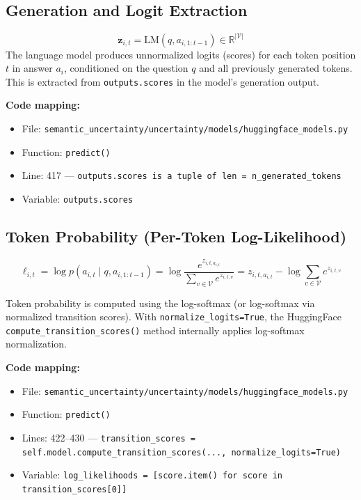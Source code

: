 \documentclass{article}
\begin{document}
\subsection{Generation and Logit Extraction}

\begin{equation}
\boldsymbol{z}_{i,t} = \text{LM}(q, a_{i,1:t-1}) \in \mathbb{R}^{|{\mathcal{V}}|}
\label{eq:logits}
\end{equation}
The language model produces unnormalized logits (scores) for each token position $t$ in answer $a_i$, conditioned on the question $q$ and all previously generated tokens. This is extracted from \texttt{outputs.scores} in the model's generation output.

\textbf{Code mapping:}
\begin{itemize}
    \item File: \texttt{semantic\_uncertainty/uncertainty/models/huggingface\_models.py}
    \item Function: \texttt{predict()}
    \item Line: 417 --- \texttt{outputs.scores is a tuple of len = n\_generated\_tokens}
    \item Variable: \texttt{outputs.scores}
\end{itemize}

\subsection{Token Probability (Per-Token Log-Likelihood)}

\begin{equation}
\ell_{i,t} = \log p(a_{i,t} \mid q, a_{i,1:t-1}) = \log \frac{e^{z_{i,t,a_{i,t}}}}{\sum_{v \in \mathcal{V}} e^{z_{i,t,v}}} = z_{i,t,a_{i,t}} - \log \sum_{v \in \mathcal{V}} e^{z_{i,t,v}}
\label{eq:token_logprob}
\end{equation}

Token probability is computed using the log-softmax (or log-softmax via normalized transition scores). With \texttt{normalize\_logits=True}, the HuggingFace \texttt{compute\_transition\_scores()} method internally applies log-softmax normalization.

\textbf{Code mapping:}
\begin{itemize}
    \item File: \texttt{semantic\_uncertainty/uncertainty/models/huggingface\_models.py}
    \item Function: \texttt{predict()}
    \item Lines: 422--430 --- \texttt{transition\_scores = self.model.compute\_transition\_scores(..., normalize\_logits=True)}
    \item Variable: \texttt{log\_likelihoods = [score.item() for score in transition\_scores[0]]}
\end{itemize}
\end{document}
